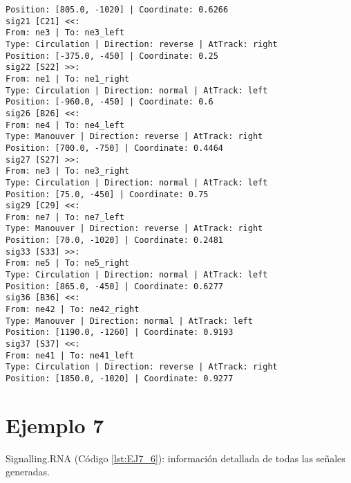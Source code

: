 \begin{lstlisting}[language = {}, caption = Signalling.RNA, label = {lst:EJ6_6}]
Position: [805.0, -1020] | Coordinate: 0.6266
sig21 [C21] <<:
From: ne3 | To: ne3_left
Type: Circulation | Direction: reverse | AtTrack: right 
Position: [-375.0, -450] | Coordinate: 0.25
sig22 [S22] >>:
From: ne1 | To: ne1_right
Type: Circulation | Direction: normal | AtTrack: left 
Position: [-960.0, -450] | Coordinate: 0.6
sig26 [B26] <<:
From: ne4 | To: ne4_left
Type: Manouver | Direction: reverse | AtTrack: right 
Position: [700.0, -750] | Coordinate: 0.4464
sig27 [S27] >>:
From: ne3 | To: ne3_right
Type: Circulation | Direction: normal | AtTrack: left 
Position: [75.0, -450] | Coordinate: 0.75
sig29 [C29] <<:
From: ne7 | To: ne7_left
Type: Manouver | Direction: reverse | AtTrack: right 
Position: [70.0, -1020] | Coordinate: 0.2481
sig33 [S33] >>:
From: ne5 | To: ne5_right
Type: Circulation | Direction: normal | AtTrack: left 
Position: [865.0, -450] | Coordinate: 0.6277
sig36 [B36] <<:
From: ne42 | To: ne42_right
Type: Manouver | Direction: normal | AtTrack: left 
Position: [1190.0, -1260] | Coordinate: 0.9193
sig37 [S37] <<:
From: ne41 | To: ne41_left
Type: Circulation | Direction: reverse | AtTrack: right 
Position: [1850.0, -1020] | Coordinate: 0.9277
	\end{lstlisting}	
	\section{Ejemplo 7}
	Signalling.RNA (Código \ref{lst:EJ7_6}): información detallada de todas las señales generadas.
	
